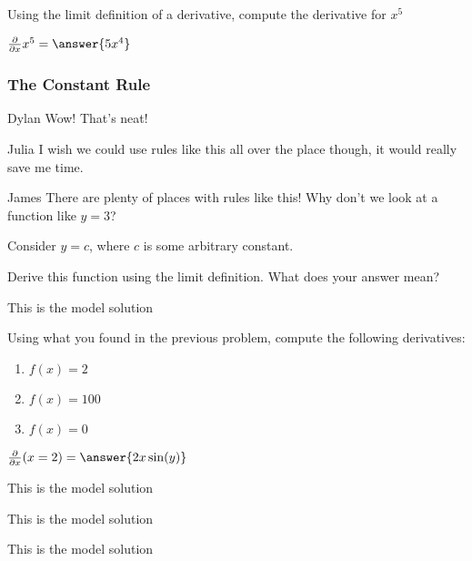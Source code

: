 \documentclass{ximera}
\begin{document}
\begin{question}
Using the limit definition of a derivative, compute the derivative for $x^5$

$ \frac{\partial}{\partial x} x^5 =  \answer{5x^4}$
\end{question}

\subsubsection{The Constant Rule}
\begin{dialogue}
\item[Dylan] Wow! That's neat!
\item[Julia] I wish we could use rules like this all over the place though, it would really save me time.
\item[James] There are plenty of places with rules like this! Why don't we look at a function like $y = 3$?
\end{dialogue}

Consider $y = c$, where $c$ is some arbitrary constant.
\begin{question}
Derive this function using the limit definition. What does your answer mean?
\begin{freeResponse}
This is the model solution %
\end{freeResponse}
\end{question}

\begin{question}
Using what you found in the previous problem, compute the following derivatives:
\begin{enumerate}
\item{$f(x)=2$}
\item{$f(x)=100$}
\item{$f(x)=0$}
\end{enumerate}

$ \frac{\partial}{\partial x}(x=2) =  \answer{2x\sin(y)}$

\begin{freeResponse}
This is the model solution %
\end{freeResponse}
\begin{freeResponse}
This is the model solution %
\end{freeResponse}
\begin{freeResponse}
This is the model solution %
\end{freeResponse}
\end{question}
\end{document}
